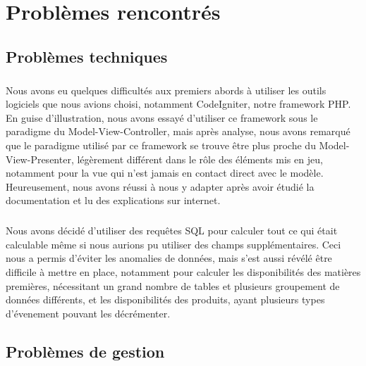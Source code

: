 \chapter{Problèmes rencontrés}


\section{Problèmes techniques}
    \paragraph{}
        Nous avons eu quelques difficultés aux premiers abords à utiliser les 
        outils logiciels que nous avions choisi, notamment CodeIgniter, notre
        framework PHP.
        En guise d'illustration, nous avons essayé d'utiliser ce framework 
        sous le paradigme du Model-View-Controller, mais après analyse,
        nous avons remarqué que le paradigme utilisé par ce framework
        se trouve être plus proche du
        Model-View-Presenter, légèrement différent dans le rôle
        des éléments mis en jeu, notamment pour la vue qui n'est
        jamais en contact direct avec le modèle.
        Heureusement, nous avons réussi à nous y adapter après avoir étudié
        la documentation et lu des explications sur internet.

    \paragraph{}
        Nous avons décidé d'utiliser des requêtes SQL pour calculer tout ce qui
        était calculable même si nous aurions pu utiliser des champs
        supplémentaires.
        Ceci nous a permis d'éviter les anomalies de données, mais s'est aussi
        révélé être difficile à mettre en place, notamment pour calculer les 
        disponibilités des matières premières, nécessitant un grand nombre de 
        tables et plusieurs groupement de données différents, et les
        disponibilités des produits, ayant plusieurs types d'évenement pouvant
        les décrémenter.
        
\section{Problèmes de gestion}
